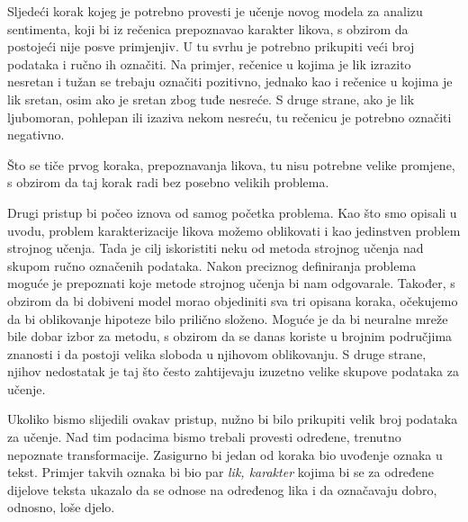 \documentclass[a4paper,twoside,12pt]{memoir} %
\newcommand{\ti}[1]{\textit{#1\/}}
\begin{document}
		Sljedeći korak kojeg je potrebno provesti je učenje novog modela za analizu sentimenta, koji bi iz rečenica prepoznavao karakter likova, s obzirom da postojeći nije posve primjenjiv. U tu svrhu je potrebno prikupiti veći broj podataka i ručno ih označiti. Na primjer, rečenice u kojima je lik izrazito nesretan i tužan se trebaju označiti pozitivno, jednako kao i rečenice u kojima je lik sretan, osim ako je sretan zbog tuđe nesreće. S druge strane, ako je lik ljubomoran, pohlepan ili izaziva nekom nesreću, tu rečenicu je potrebno označiti negativno.

		Što se tiče prvog koraka, prepoznavanja likova, tu nisu potrebne velike promjene, s obzirom da taj korak radi bez posebno velikih problema.

		\bigskip

		Drugi pristup bi počeo iznova od samog početka problema. Kao što smo opisali u uvodu, problem karakterizacije likova možemo oblikovati i kao jedinstven problem strojnog učenja. Tada je cilj iskoristiti neku od metoda strojnog učenja nad skupom ručno označenih podataka. Nakon preciznog definiranja problema moguće je prepoznati koje metode strojnog učenja bi nam odgovarale. Također, s obzirom da bi dobiveni model morao objediniti sva tri opisana koraka, očekujemo da bi oblikovanje hipoteze bilo prilično složeno. Moguće je da bi neuralne mreže bile dobar izbor za metodu, s obzirom da se danas koriste u brojnim područjima znanosti i da postoji velika sloboda u njihovom oblikovanju. S druge strane, njihov nedostatak je taj što često zahtijevaju izuzetno velike skupove podataka za učenje.

		Ukoliko bismo slijedili ovakav pristup, nužno bi bilo prikupiti velik broj podataka za učenje. Nad tim podacima bismo trebali provesti određene, trenutno nepoznate transformacije. Zasigurno bi jedan od koraka bio uvođenje oznaka u tekst. Primjer takvih oznaka bi bio par \ti{lik, karakter} kojima bi se za određene dijelove teksta ukazalo da se odnose na određenog lika i da označavaju dobro, odnosno, loše djelo.


\normalem
	\nocite{*}
	

\newpage
\end{document}
